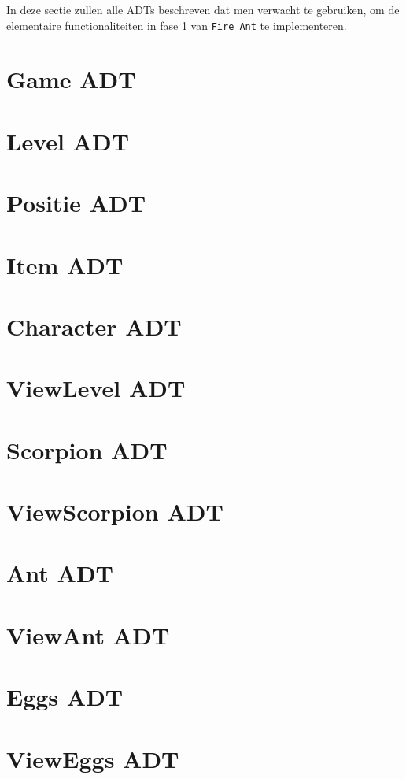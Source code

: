 In deze sectie zullen alle ADTs beschreven dat men verwacht te gebruiken, om de elementaire functionaliteiten in fase 1 van \texttt{Fire Ant} te implementeren.

\section{Game ADT}
\section{Level ADT}
\section{Positie ADT}
\section{Item ADT}
\section{Character ADT}
\section{View\textunderscore Level ADT}
\section{Scorpion ADT}
\section{View\textunderscore Scorpion ADT}
\section{Ant ADT}
\section{View\textunderscore Ant ADT}
\section{Eggs ADT}
\section{View\textunderscore Eggs ADT}
